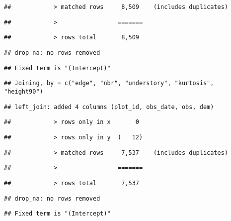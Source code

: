 \documentclass[
]{article}
\begin{document}
\begin{verbatim}
##            > matched rows     8,509    (includes duplicates)
\end{verbatim}

\begin{verbatim}
##            >                 =======
\end{verbatim}

\begin{verbatim}
##            > rows total       8,509
\end{verbatim}

\begin{verbatim}
## drop_na: no rows removed
\end{verbatim}

\begin{verbatim}
## Fixed term is "(Intercept)"
\end{verbatim}

\begin{verbatim}
## Joining, by = c("edge", "nbr", "understory", "kurtosis", "height90")
\end{verbatim}

\begin{verbatim}
## left_join: added 4 columns (plot_id, obs_date, obs, dem)
\end{verbatim}

\begin{verbatim}
##            > rows only in x       0
\end{verbatim}

\begin{verbatim}
##            > rows only in y  (   12)
\end{verbatim}

\begin{verbatim}
##            > matched rows     7,537    (includes duplicates)
\end{verbatim}

\begin{verbatim}
##            >                 =======
\end{verbatim}

\begin{verbatim}
##            > rows total       7,537
\end{verbatim}

\begin{verbatim}
## drop_na: no rows removed
\end{verbatim}

\begin{verbatim}
## Fixed term is "(Intercept)"
\end{verbatim}
\end{document}
